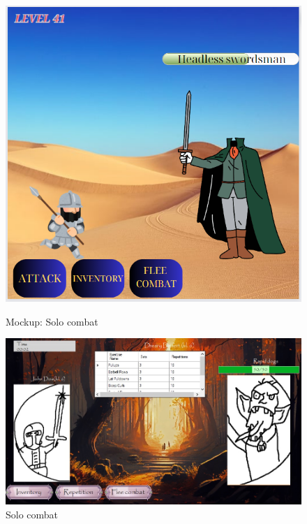 \begin{figure}[h]
    \centering
    \begin{minipage}[b]{0.45\textwidth}
        \centering
    \includegraphics[width=\textwidth]{omockup5.jpg}
    \caption{Mockup: Solo combat}
    \end{minipage}
    \hfill
    \begin{minipage}[b]{0.45\textwidth}
        \centering
    \includegraphics[width=\textwidth]{mockup5.jpg}
    \caption{Solo combat}
    \end{minipage}
\end{figure}




